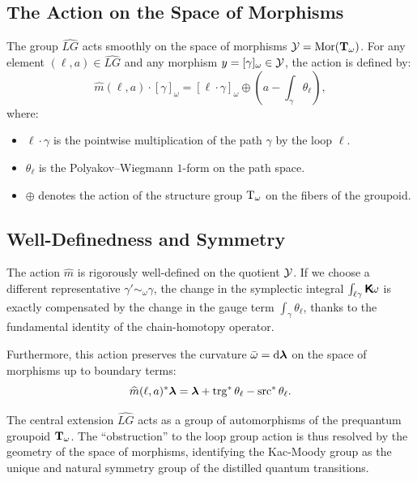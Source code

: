 \documentclass[11pt,reqno,letterpaper,twoside]{amsart}
\renewcommand{\TT}{\Groupoid{T}}
\renewcommand{\Komega}{\CHO\!\omega}
\begin{document}
  \subsection{The Action on the Space of Morphisms}
  The group $\widehat{LG}$ acts smoothly on the space of morphisms $\cY = \Mor(\TT_\omega)$.
  For any element $(\ell, a) \in \widehat{LG}$ and any morphism $y = [\gamma]_\omega \in \mathcal{Y}$,
  the action is defined by:
  \[
    \widehat{m}(\ell, a) \cdot [\gamma]_\omega = [\ell \cdot \gamma]_\omega \oplus \left( a - \int_\gamma \theta_\ell \right),
    \]
  where:
  \begin{itemize}[nosep]
    \item $\ell \cdot \gamma$ is the pointwise multiplication of the path $\gamma$ by the loop $\ell$.
    \item $\theta_\ell$ is the Polyakov--Wiegmann $1$-form on the path space.
    \item $\oplus$ denotes the action of the structure group $\mathrm{T}_\omega$ on the fibers of the groupoid.
  \end{itemize}
  
  \subsection{Well-Definedness and Symmetry}
  The action $\widehat{m}$ is rigorously well-defined on the quotient $\mathcal{Y}$.
  If we choose a different representative $\gamma' \sim_\omega \gamma$,
  the change in the symplectic integral $\int_{\ell\gamma} \Komega$ is exactly compensated by the change in the gauge term $\int_\gamma \theta_\ell$,
  thanks to the fundamental identity of the chain-homotopy operator.
  
  Furthermore,
  this action preserves the curvature $\bar{\omega} = \mathrm{d}\boldsymbol \lambda$ on the space of morphisms up to boundary terms:
  \[
    \widehat{m}(\ell, a)^* \boldsymbol \lambda = \boldsymbol \lambda + \operatorname{trg}^*\theta_\ell - \operatorname{src}^*\theta_\ell.
    \]
  
  \begin{theorem}
    The central extension $\widehat{LG}$ acts as a group of automorphisms of the prequantum groupoid $\TT_\omega$.
    The ``obstruction'' to the loop group action is thus resolved by the geometry of the space of morphisms,
    identifying the Kac-Moody group as the unique and natural symmetry group of the distilled quantum transitions.
  \end{theorem}
  
  
\end{document}
